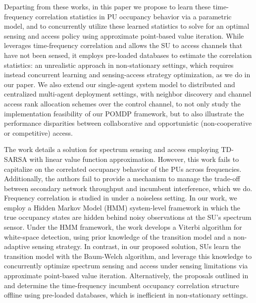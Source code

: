 \documentclass[12pt, draftcls, onecolumn]{IEEEtran}
\begin{document}
Departing from these works, in this paper we propose to learn these time-frequency correlation statistics in PU occupancy behavior via a parametric model, and to concurrently utilize these learned statistics to solve for an optimal sensing and access policy using approximate point-based value iteration. While \cite{WCL:7} leverages time-frequency correlation and allows the SU to access channels that have not been sensed, it employs pre-loaded databases to estimate the correlation statistics: an unrealistic approach in non-stationary settings, which requires instead concurrent learning and sensing-access strategy optimization, as we do in our paper. We also extend our single-agent system model to distributed and centralized multi-agent deployment settings, with neighbor discovery and channel access rank allocation schemes over the control channel, to not only study the implementation feasibility of our POMDP framework, but to also illustrate the performance disparities between collaborative and opportunistic (non-cooperative or competitive) access.

 The work \cite{WCL:5} details a solution for spectrum sensing and access employing TD-SARSA with linear value function approximation. However, this work fails to capitalize on the correlated occupancy behavior of the PUs across frequencies. Additionally, the authors fail to provide a mechanism to manage the trade-off between secondary network throughput and incumbent interference, which we do. Frequency correlation is studied in \cite{WCL:7} under a noiseless setting. In our work, we employ a Hidden Markov Model (HMM) system-level framework in which the true occupancy states are hidden behind noisy observations at the SU's spectrum sensor. Under the HMM framework, the work \cite{WCL:6} develops a Viterbi algorithm for white-space detection, using prior knowledge of the transition model and a non-adaptive sensing strategy. In contrast, in our proposed solution, SUs learn the transition model with the Baum-Welch algorithm, and leverage this knowledge to concurrently optimize spectrum sensing and access under sensing limitations via approximate point-based value iteration. Alternatively, the proposals outlined in \cite{WCL:6} and \cite{WCL:7} determine the time-frequency incumbent occupancy correlation structure offline using pre-loaded databases, which is inefficient in non-stationary settings.
\end{document}

